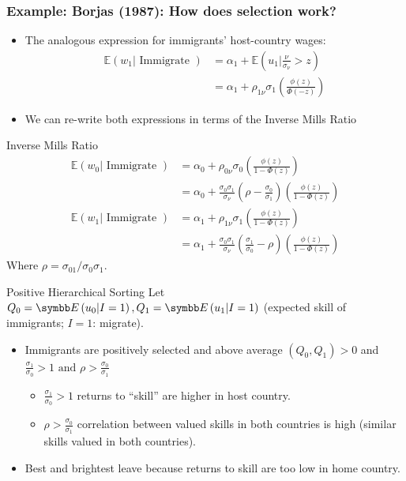 \documentclass[aspectratio=169,11pt]{beamer}
\begin{document}
\begin{frame}
\frametitle{Example: Borjas (1987): How does selection work?}
\begin{itemize}
\item The analogous expression for immigrants' host-country wages:
\begin{align*}
\mathbb{E}\left(w_{1} | \text { Immigrate }\right) &=\alpha_{1}+\mathbb{E}\left(u_{1} | \frac{\nu}{\sigma_{\nu}}>z\right) \\
&=\alpha_{1}+\rho_{1 \nu} \sigma_{1}\left(\frac{\phi(z)}{\Phi(-z)}\right)
\end{align*}
\item We can re-write both expressions in terms of the \alert{Inverse Mills Ratio}
\end{itemize}
\end{frame}

\begin{frame}{Inverse Mills Ratio}
\begin{align*}
\mathbb{E}\left(w_{0} | \text { Immigrate }\right) &=\alpha_{0}+\rho_{0 \nu} \sigma_{0}\left(\frac{\phi(z)}{1-\Phi(z)}\right) \\
&=\alpha_{0}+\frac{\sigma_{0} \sigma_{1}}{\sigma_{\nu}}\left(\rho-\frac{\sigma_{0}}{\sigma_{1}}\right)\left(\frac{\phi(z)}{1-\Phi(z)}\right) \\
\mathbb{E}\left(w_{1} | \text { Immigrate }\right) &=\alpha_{1}+\rho_{1 \nu} \sigma_{1}\left(\frac{\phi(z)}{1-\Phi(z)}\right) \\
&=\alpha_{1}+\frac{\sigma_{0} \sigma_{1}}{\sigma_{\nu}}\left(\frac{\sigma_{1}}{\sigma_{0}}-\rho\right)\left(\frac{\phi(z)}{1-\Phi(z)}\right)
\end{align*}
Where $\rho=\sigma_{01} / \sigma_{0} \sigma_{1}$.
\end{frame}



\begin{frame}{Positive Hierarchical Sorting}
Let $Q_{0}=\E\left(u_{0} | I=1\right), Q_{1}=\E\left(u_{1} | I=1\right)$ (expected \alert{skill} of immigrants; $I=1$: migrate).
\begin{itemize}
\item Immigrants are positively selected and above average $(Q_0,Q_1) > 0$ and $\frac{\sigma_{1}}{\sigma_{0}}>1 \text { and } \rho>\frac{\sigma_{0}}{\sigma_{1}}$
\begin{itemize}
\item $\frac{\sigma_{1}}{\sigma_{0}}>1$ returns to ``skill'' are higher in host country.
\item $\rho>\frac{\sigma_{0}}{\sigma_{1}}$ correlation between valued skills in both countries is high (similar skills valued in both countries).
\end{itemize}
\item Best and brightest leave because returns to skill are too low in home country.
\end{itemize}
\end{frame}
\end{document}
